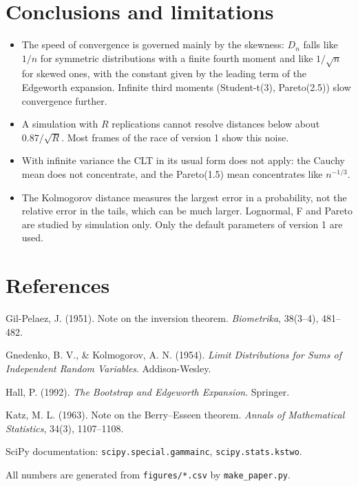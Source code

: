 \documentclass[11pt,a4paper]{article}
\begin{document}
\section{Conclusions and limitations}

\begin{itemize}
  \item The speed of convergence is governed mainly by the skewness: $D_n$ falls like $1/n$ for symmetric distributions with a finite
  fourth moment and like $1/\sqrt n$ for skewed ones, with the constant given by the leading term of the Edgeworth expansion.
  Infinite third moments (Student-t(3), Pareto(2.5)) slow convergence further.
  \item A simulation with $R$ replications cannot resolve distances below about $0.87/\sqrt R$. Most frames of the race of version 1
  show this noise.
  \item With infinite variance the CLT in its usual form does not apply: the Cauchy mean does not concentrate, and the Pareto(1.5)
  mean concentrates like $n^{-1/3}$.
  \item The Kolmogorov distance measures the largest error in a probability, not the relative error in the tails, which can be much
  larger. Lognormal, F and Pareto are studied by simulation only. Only the default parameters of version 1 are used.
\end{itemize}

\section*{References}
{\small
\setlength{\parskip}{2pt}
\hangindent=1.27cm Gil-Pelaez, J. (1951). Note on the inversion theorem. \textit{Biometrika}, 38(3--4), 481--482.\par
\hangindent=1.27cm Gnedenko, B. V., \& Kolmogorov, A. N. (1954). \textit{Limit Distributions for Sums of Independent Random Variables}. Addison-Wesley.\par
\hangindent=1.27cm Hall, P. (1992). \textit{The Bootstrap and Edgeworth Expansion}. Springer.\par
\hangindent=1.27cm Katz, M. L. (1963). Note on the Berry--Esseen theorem. \textit{Annals of Mathematical Statistics}, 34(3), 1107--1108.\par
\hangindent=1.27cm SciPy documentation: \texttt{scipy.special.gammainc}, \texttt{scipy.stats.kstwo}.\par

\smallskip
All numbers are generated from
\texttt{figures/*.csv} by \texttt{make\_paper.py}.
}
\end{document}
